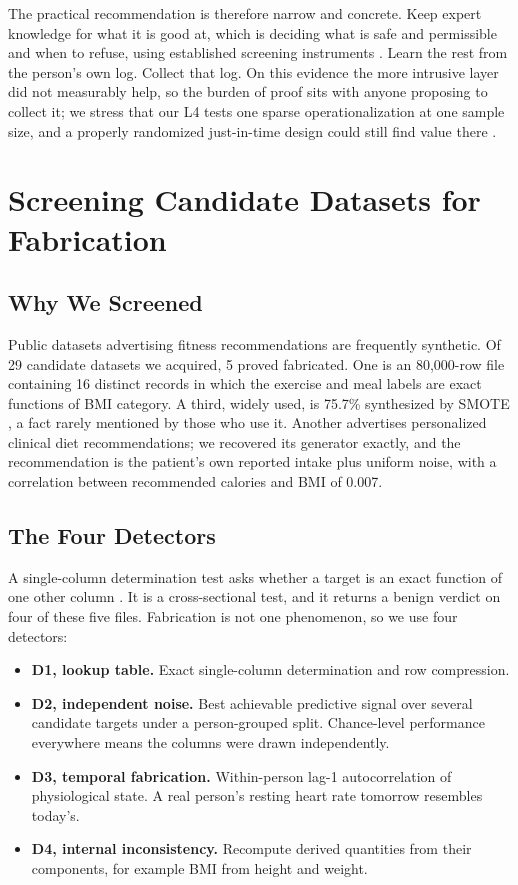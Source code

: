 \documentclass[conference]{IEEEtran}
\begin{document}
The practical recommendation is therefore narrow and concrete. Keep expert knowledge for what it is good at, which is deciding what is safe and permissible and when to refuse, using established screening instruments \cite{warburton2011parqplus}. Learn the rest from the person's own log. Collect that log. On this evidence the more intrusive layer did not measurably help, so the burden of proof sits with anyone proposing to collect it; we stress that our L4 tests one sparse operationalization at one sample size, and a properly randomized just-in-time design could still find value there \cite{nahumshani2018jitai, klasnja2015mrt}.


\appendices
\section{Screening Candidate Datasets for Fabrication}
\label{app:battery}
\subsection{Why We Screened}
Public datasets advertising fitness recommendations are frequently synthetic. Of 29 candidate datasets we acquired, 5 proved fabricated. One is an 80{,}000-row file containing 16 distinct records in which the exercise and meal labels are exact functions of BMI category. A third, widely used, is 75.7\% synthesized by SMOTE \cite{chawla2002smote, palechor2019obesity}, a fact rarely mentioned by those who use it. Another advertises personalized clinical diet recommendations; we recovered its generator exactly, and the recommendation is the patient's own reported intake plus uniform noise, with a correlation between recommended calories and BMI of 0.007.

\subsection{The Four Detectors}
A single-column determination test asks whether a target is an exact function of one other column \cite{huhtala1999tane, abedjan2015profiling}. It is a cross-sectional test, and it returns a benign verdict on four of these five files. Fabrication is not one phenomenon, so we use four detectors:

\begin{itemize}
\item \textbf{D1, lookup table.} Exact single-column determination and row compression.
\item \textbf{D2, independent noise.} Best achievable predictive signal over several candidate targets under a person-grouped split. Chance-level performance everywhere means the columns were drawn independently.
\item \textbf{D3, temporal fabrication.} Within-person lag-1 autocorrelation of physiological state. A real person's resting heart rate tomorrow resembles today's.
\item \textbf{D4, internal inconsistency.} Recompute derived quantities from their components, for example BMI from height and weight.
\end{itemize}
\end{document}
